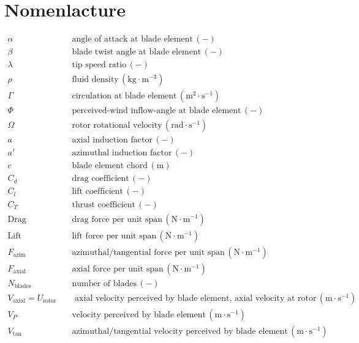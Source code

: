 \chapter{Nomenlacture}
\begin{align*}
\alpha & \quad \text{angle of attack at blade element} \, (-) \\
\beta & \quad \text{blade twist angle at blade element} \, (-) \\
\lambda & \quad \text{tip speed ratio} \, (-) \\
\rho & \quad \text{fluid density} \, (\text{kg} \cdot \text{m}^{-3}) \\
\Gamma & \quad \text{circulation at blade element} \, (\text{m}^2 \cdot \text{s}^{-1}) \\
\Phi & \quad \text{perceived-wind inflow-angle at blade element} \, (-) \\
\Omega & \quad \text{rotor rotational velocity} \, (\text{rad} \cdot \text{s}^{-1}) \\
a & \quad \text{axial induction factor} \, (-) \\
a' & \quad \text{azimuthal induction factor} \, (-) \\
c & \quad \text{blade element chord} \, (\text{m}) \\
C_d & \quad \text{drag coefficient} \, (-) \\
C_l & \quad \text{lift coefficient} \, (-) \\
C_T & \quad \text{thrust coefficient} \, (-) \\
\text{Drag} & \quad \text{drag force per unit span} \, (\text{N} \cdot \text{m}^{-1}) \\
\text{Lift} & \quad \text{lift force per unit span} \, (\text{N} \cdot \text{m}^{-1}) \\
F_{\text{azim}} & \quad \text{azimuthal/tangential force per unit span} \, (\text{N} \cdot \text{m}^{-1}) \\
F_{\text{axial}} & \quad \text{axial force per unit span} \, (\text{N} \cdot \text{m}^{-1}) \\
N_{\text{blades}} & \quad \text{number of blades} \, (-) \\
V_{\text{axial}}=U_{\text{rotor}} & \quad  \text{ axial velocity perceived by blade element, axial velocity at rotor} \, (\text{m} \cdot \text{s}^{-1}) \\
V_P & \quad \text{velocity perceived by blade element} \, (\text{m} \cdot \text{s}^{-1}) \\
V_{\text{tan}} & \quad \text{azimuthal/tangential velocity perceived by blade element} \, (\text{m} \cdot \text{s}^{-1})
\end{align*}
